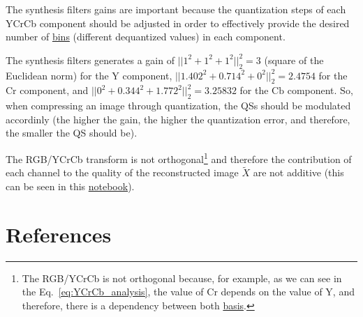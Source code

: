 The synthesis filters gains are important because the quantization
steps of each YCrCb component should be adjusted in order to
effectively provide the desired number of
\href{http://www.winlab.rutgers.edu/~crose/322_html/quantization.pdf}{bins}
(different dequantized values) in each component.

The synthesis filters generates a gain of $||1^2 + 1^2 + 1^2||_2^2=3$
(square of the Euclidean norm) for the $\text{Y}$ component,
$||1.402^2 + 0.714^2 + 0^2||_2^2=2.4754$ for the $\text{Cr}$
component, and $||0^2 + 0.344^2+ 1.772^2||_2^2=3.25832$ for the
$\text{Cb}$ component. So, when compressing an image through
quantization, the QSs should be modulated accordinly (the higher the
gain, the higher the quantization error, and therefore, the smaller
the QS should be).

The RGB/YCrCb
transform is not orthogonal\footnote{The RGB/YCrCb is not orthogonal
because, for example, as we can see in the
Eq.~\ref{eq:YCrCb_analysis}, the value of Cr depends on the value of
Y, and therefore, there is a dependency between both
\href{https://en.wikipedia.org/wiki/Basis_(linear_algebra)}{basis}.}
and therefore the contribution of each channel to the quality of the
reconstructed image $\tilde{X}$ are not additive (this can be seen in
this
\href{https://github.com/Sistemas-Multimedia/Sistemas-Multimedia.github.io/blob/master/study_guide/06-color_transform/performance.ipynb}{notebook}).

\section{References}
\renewcommand{\addcontentsline}[3]{}%

